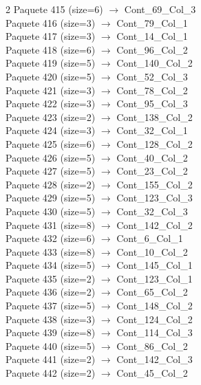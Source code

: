 \begin{multicols}{2}
Paquete 415 (size=6) $\rightarrow$ Cont\_69\_Col\_3\\
Paquete 416 (size=3) $\rightarrow$ Cont\_79\_Col\_1\\
Paquete 417 (size=3) $\rightarrow$ Cont\_14\_Col\_1\\
Paquete 418 (size=6) $\rightarrow$ Cont\_96\_Col\_2\\
Paquete 419 (size=5) $\rightarrow$ Cont\_140\_Col\_2\\
Paquete 420 (size=5) $\rightarrow$ Cont\_52\_Col\_3\\
Paquete 421 (size=3) $\rightarrow$ Cont\_78\_Col\_2\\
Paquete 422 (size=3) $\rightarrow$ Cont\_95\_Col\_3\\
Paquete 423 (size=2) $\rightarrow$ Cont\_138\_Col\_2\\
Paquete 424 (size=3) $\rightarrow$ Cont\_32\_Col\_1\\
Paquete 425 (size=6) $\rightarrow$ Cont\_128\_Col\_2\\
Paquete 426 (size=5) $\rightarrow$ Cont\_40\_Col\_2\\
Paquete 427 (size=5) $\rightarrow$ Cont\_23\_Col\_2\\
Paquete 428 (size=2) $\rightarrow$ Cont\_155\_Col\_2\\
Paquete 429 (size=5) $\rightarrow$ Cont\_123\_Col\_3\\
Paquete 430 (size=5) $\rightarrow$ Cont\_32\_Col\_3\\
Paquete 431 (size=8) $\rightarrow$ Cont\_142\_Col\_2\\
Paquete 432 (size=6) $\rightarrow$ Cont\_6\_Col\_1\\
Paquete 433 (size=8) $\rightarrow$ Cont\_10\_Col\_2\\
Paquete 434 (size=5) $\rightarrow$ Cont\_145\_Col\_1\\
Paquete 435 (size=2) $\rightarrow$ Cont\_123\_Col\_1\\
Paquete 436 (size=2) $\rightarrow$ Cont\_65\_Col\_2\\
Paquete 437 (size=5) $\rightarrow$ Cont\_148\_Col\_2\\
Paquete 438 (size=3) $\rightarrow$ Cont\_124\_Col\_2\\
Paquete 439 (size=8) $\rightarrow$ Cont\_114\_Col\_3\\
Paquete 440 (size=5) $\rightarrow$ Cont\_86\_Col\_2\\
Paquete 441 (size=2) $\rightarrow$ Cont\_142\_Col\_3\\
Paquete 442 (size=2) $\rightarrow$ Cont\_45\_Col\_2\\

\end{multicols}
